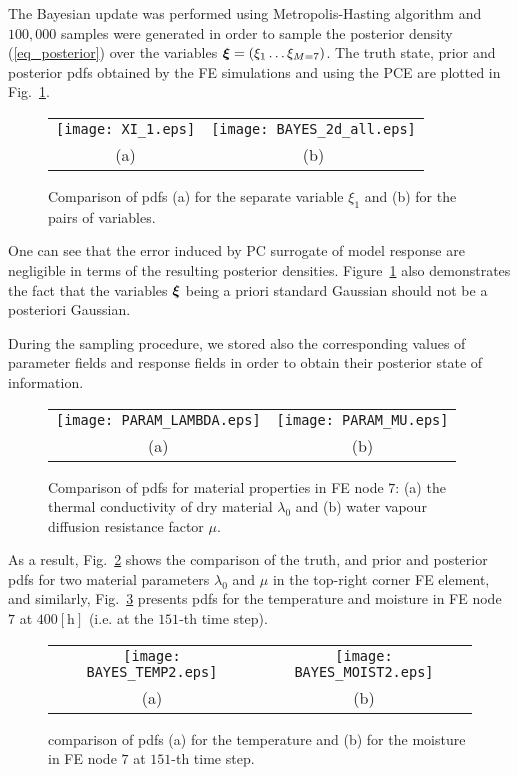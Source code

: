 \documentclass[preprint,12pt]{elsarticle}
\newcommand{\vek}[1]{\mathchoice{\displaystyle\boldsymbol#1}
{\textstyle\boldsymbol#1}{\scriptstyle\boldsymbol#1}
{\scriptscriptstyle\boldsymbol#1}}
\begin{document}
The Bayesian update was performed using Metropolis-Hasting
algorithm and $100,000$ samples were generated in order to sample
the posterior density (\ref{eq_posterior}) over the variables
$\vek{\xi} = (\xi_1 \dots \xi_{M=7})$. The truth state, prior and
posterior pdfs obtained by the FE simulations and using the
PCE are plotted in Fig.~\ref{fig_pdf_xi}.
\begin{figure} [ht!]
\centering
\begin{tabular}{cc}
\texttt{[image: XI\_1.eps]}&
\texttt{[image: BAYES\_2d\_all.eps]}\\
(a)&(b)
\end{tabular}
\caption{Comparison of pdfs (a) for the separate variable $\xi_1$ and
  (b) for the pairs of variables.}
\label{fig_pdf_xi}
\end{figure}
One can see that the error induced by PC surrogate of model
response are negligible in terms of the resulting posterior
densities. Figure~\ref{fig_pdf_xi} also demonstrates the fact that
the variables $\vek{\xi}$ being a priori standard Gaussian should
not be a posteriori Gaussian.

During the sampling procedure, we stored also the corresponding values
of parameter fields and response fields in order to obtain their
posterior state of information.
\begin{figure} [ht!]
\centering
\begin{tabular}{cc}
\texttt{[image: PARAM\_LAMBDA.eps]}&
\texttt{[image: PARAM\_MU.eps]}\\
(a)&(b)
\end{tabular}
\caption{Comparison of pdfs for material properties in FE node $7$:
  (a) the thermal conductivity of dry material $\lambda_0$ and (b)
  water vapour diffusion resistance factor $\mu$.}
\label{fig_pdf_matpar}
\end{figure}
As a result, Fig.~\ref{fig_pdf_matpar} shows the comparison of the
truth, and prior and posterior pdfs for two material parameters
$\lambda_0$ and $\mu$ in the top-right corner FE element, and
similarly, Fig.~\ref{fig_pdf_resp} presents pdfs for the
temperature and moisture in FE node $7$ at $400 [\mathrm{h}]$
(i.e. at the $151$-th time step).
\begin{figure} [ht!]
\centering
\begin{tabular}{cc}
\texttt{[image: BAYES\_TEMP2.eps]}&
\texttt{[image: BAYES\_MOIST2.eps]}\\
(a)&(b)
\end{tabular}
\caption{comparison of pdfs (a) for the temperature and (b) for the
  moisture in FE node $7$ at $151$-th time step.}
\label{fig_pdf_resp}
\end{figure}
\end{document}
